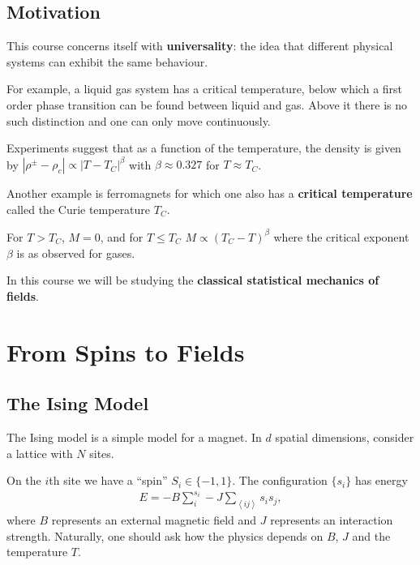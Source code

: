 
\subsection*{Motivation}

This course concerns itself with \textbf{universality}: the idea that different physical systems can exhibit the same behaviour.

For example, a liquid gas system has a critical temperature, below which a first order phase transition can be found between liquid and gas. Above it there is no such distinction and one can only move continuously.

Experiments suggest that as a function of the temperature, the density is given by $\left| \rho^{\pm} - \rho_c \right| \propto \left|  T - T_C \right|^{\beta}$ with $\beta \approx 0.327$ for $T \approx T_C$.

Another example is ferromagnets for which one also has a \textbf{critical temperature} called the Curie temperature $T_C$.

For $T > T_C$, $M = 0$, and for $T \leq T_C$ $M \propto \left( T_C - T \right)^{\beta}$ where the critical exponent $\beta$ is as observed for gases.

In this course we will be studying the \textbf{classical statistical mechanics of fields}.

\section{From Spins to Fields}

\subsection{The Ising Model}

The Ising model is a simple model for a magnet. In $d$ spatial dimensions, consider a lattice with $N$ sites.

On the $i$th site we have a ``spin'' $S_{i} \in \{-1,1\} $. The configuration $\{s_{i}\} $ has energy 
\begin{align}
    E = - B \sum_{i}^{s_{i}} - J \sum_{\left<ij \right>}^{} s_{i} s_{j}
,\end{align}
where $B$ represents an external magnetic field and $J$ represents an interaction strength. Naturally, one should ask how the physics depends on $B$, $J$ and the temperature $T$.

